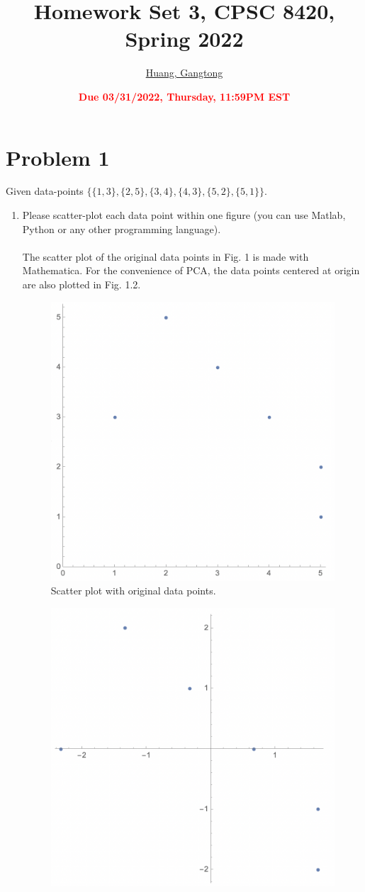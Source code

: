 \documentclass[11pt]{article}
\title{{\bf Homework Set 3, CPSC 8420, Spring 2022}} %
\author{\Large\underline{Huang, Gangtong}}
\date{\textbf{\Large\textcolor{red}{Due 03/31/2022, Thursday, 11:59PM EST}}} %
\begin{document}
\maketitle

\section*{Problem 1}
Given data-points $\{\{1,3\},\{2,5\},\{3,4\},\{4,3\},\{5,2\},\{5,1\}\}$.
\begin{enumerate}
	\item Please scatter-plot each data point within one figure (you can use Matlab, Python or any other programming language).\\ \\
	The scatter plot of the original data points in Fig. 1 is made with Mathematica. For the convenience of PCA, the data points centered at origin are also plotted in Fig. 1.2.
	\begin{figure}[H] %
		\centering\includegraphics[width=0.6\linewidth]{prob1_scatter.png}
		\caption{Scatter plot with original data points.} %
		\label{fig:fig1}  %
	\end{figure}
	\begin{figure}[H] %
		\centering\includegraphics[width=0.6\linewidth]{prob1_scattercent.png}

\end{figure}
\end{enumerate}
\end{document}
